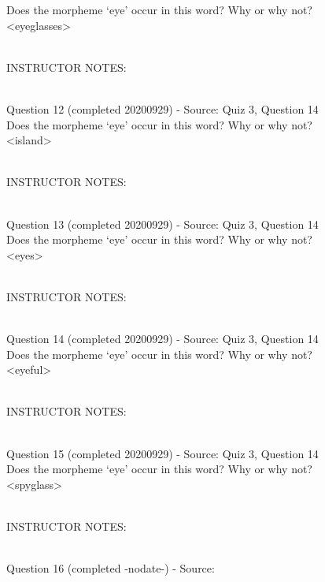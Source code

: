 \documentclass[12pt]{article}
\begin{document}
Does the morpheme ‘eye’ occur in this word? Why or why not?\\

<eyeglasses>


~\\
INSTRUCTOR NOTES: 


~\\

{\large Question 12} (completed 20200929) - Source: Quiz 3, Question 14\\

Does the morpheme ‘eye’ occur in this word? Why or why not?\\

<island>


~\\
INSTRUCTOR NOTES: 


~\\

{\large Question 13} (completed 20200929) - Source: Quiz 3, Question 14\\

Does the morpheme ‘eye’ occur in this word? Why or why not?\\

<eyes>


~\\
INSTRUCTOR NOTES: 


~\\

{\large Question 14} (completed 20200929) - Source: Quiz 3, Question 14\\

Does the morpheme ‘eye’ occur in this word? Why or why not?\\

<eyeful>


~\\
INSTRUCTOR NOTES: 


~\\

{\large Question 15} (completed 20200929) - Source: Quiz 3, Question 14\\

Does the morpheme ‘eye’ occur in this word? Why or why not?\\

<spyglass>


~\\
INSTRUCTOR NOTES: 


~\\

{\large Question 16} (completed -nodate-) - Source: \\
\end{document}
